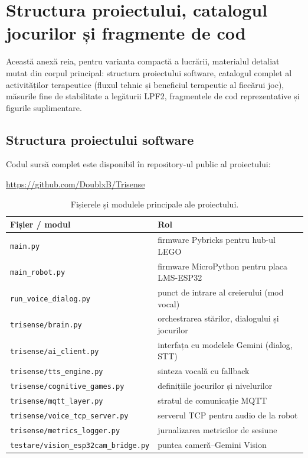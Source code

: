 \appendix

\chapter{Structura proiectului, catalogul jocurilor și fragmente de cod}
\label{anexa:cod}

Această anexă reia, pentru varianta compactă a lucrării, materialul detaliat mutat din corpul principal: structura proiectului software, catalogul complet al activităților terapeutice (fluxul tehnic și beneficiul terapeutic al fiecărui joc), măsurile fine de stabilitate a legăturii LPF2, fragmentele de cod reprezentative și figurile suplimentare.

\section{Structura proiectului software}

Codul sursă complet este disponibil în repository-ul public al proiectului:
\begin{center}
    \url{https://github.com/DoublxB/Trisense}
\end{center}

\begin{table}[htb]
    \centering
    \caption{Fișierele și modulele principale ale proiectului.}
    \label{tab:structura}
    \small
    \begin{tabular}{|l|l|}
        \hline
        \textbf{Fișier / modul} & \textbf{Rol} \\
        \hline
        \texttt{main.py} & firmware Pybricks pentru hub-ul LEGO \\
        \texttt{main\_robot.py} & firmware MicroPython pentru placa LMS-ESP32 \\
        \texttt{run\_voice\_dialog.py} & punct de intrare al creierului (mod vocal) \\
        \texttt{trisense/brain.py} & orchestrarea stărilor, dialogului și jocurilor \\
        \texttt{trisense/ai\_client.py} & interfața cu modelele Gemini (dialog, STT) \\
        \texttt{trisense/tts\_engine.py} & sinteza vocală cu fallback \\
        \texttt{trisense/cognitive\_games.py} & definițiile jocurilor și nivelurilor \\
        \texttt{trisense/mqtt\_layer.py} & stratul de comunicație MQTT \\
        \texttt{trisense/voice\_tcp\_server.py} & serverul TCP pentru audio de la robot \\
        \texttt{trisense/metrics\_logger.py} & jurnalizarea metricilor de sesiune \\
        \texttt{testare/vision\_esp32cam\_bridge.py} & puntea cameră--Gemini Vision \\
        \hline
    \end{tabular}
\end{table}

